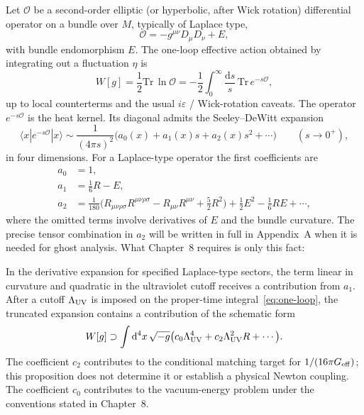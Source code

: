Let \(\mathcal{O}\) be a second-order elliptic (or hyperbolic, after
Wick rotation) differential operator on a bundle over \(M\), typically
of Laplace type,
\begin{equation}
  \label{eq:laplace-type}
  \mathcal{O}=-g^{\mu\nu}D_\mu D_\nu+E,
\end{equation}
with bundle endomorphism \(E\). The one-loop effective action obtained
by integrating out a fluctuation \(\eta\) is
\begin{equation}
  \label{eq:one-loop}
  W[g]
  =\frac12\mathrm{Tr}\,\ln\mathcal{O}
  =-\frac12\int_0^\infty\frac{\mathrm{d}s}{s}\,\mathrm{Tr}\,e^{-s\mathcal{O}},
\end{equation}
up to local counterterms and the usual \(i\varepsilon\) / Wick-rotation
caveats. The operator \(e^{-s\mathcal{O}}\) is the heat kernel. Its
diagonal admits the Seeley--DeWitt expansion
\begin{equation}
  \label{eq:SDW}
  \langle x|e^{-s\mathcal{O}}|x\rangle
  \sim
  \frac{1}{(4\pi s)^{2}}
  \bigl(
    a_0(x)+a_1(x)s+a_2(x)s^2+\cdots
  \bigr)
  \qquad(s\to 0^+),
\end{equation}
in four dimensions. For a Laplace-type operator the first coefficients
are
\begin{equation}
  \label{eq:SDW-coeffs}
  \begin{aligned}
    a_0&=1,\\
    a_1&=\frac16 R-E,\\
    a_2&=\frac{1}{180}\bigl(
           R_{\mu\nu\rho\sigma}R^{\mu\nu\rho\sigma}
          -R_{\mu\nu}R^{\mu\nu}
          +\tfrac52 R^2
         \bigr)
         +\frac12 E^2
         -\frac16 RE
         +\cdots,
  \end{aligned}
\end{equation}
where the omitted terms involve derivatives of \(E\) and the bundle
curvature. The precise tensor combination in \(a_2\) will be written
in full in Appendix~A when it is needed for ghost analysis. What
Chapter~8 requires is only this fact:

\begin{proposition}
  \label{prop:a1-G}
  In the derivative expansion for specified Laplace-type sectors,
  the term linear in curvature and quadratic in the ultraviolet
  cutoff receives a contribution from \(a_1\). After a cutoff
  \(\Lambda_{\mathrm{UV}}\) is imposed on the proper-time integral~\eqref{eq:one-loop},
  the truncated expansion contains a contribution of the schematic form
  \begin{equation}
    \label{eq:W-R}
    W[g]
    \supset
    \int\mathrm{d}^4x\,\sqrt{-g}
    \bigl(
      c_0\Lambda_{\mathrm{UV}}^4+c_2\Lambda_{\mathrm{UV}}^2 R+\cdots
    \bigr).
  \end{equation}
  The coefficient \(c_2\) contributes to the conditional matching
  target for \(1/(16\pi G_{\mathrm{eff}})\); this proposition does not determine
  it or establish a physical Newton coupling. The coefficient \(c_0\)
  contributes to the vacuum-energy problem under the conventions
  stated in Chapter~8.
\end{proposition}

